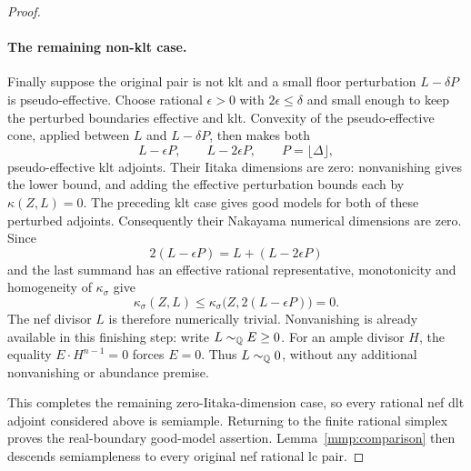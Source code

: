 \begin{proof}
\paragraph{The remaining non-klt case.}
Finally suppose the original pair is not klt and a small
floor perturbation $L-\delta P$ is pseudo-effective. Choose
rational $\epsilon>0$ with $2\epsilon\le\delta$ and small
enough to keep the perturbed boundaries effective and klt.
Convexity of the pseudo-effective cone, applied between
$L$ and $L-\delta P$, then makes both
\[
 L-\epsilon P,\qquad L-2\epsilon P,
 \qquad P=\lfloor\Delta\rfloor,
\]
pseudo-effective klt adjoints.
Their Iitaka dimensions are zero: nonvanishing gives the lower
bound, and adding the effective perturbation bounds each by
\(\kappa(Z,L)=0\).
The preceding klt case gives good models for both of these
perturbed adjoints.
Consequently their Nakayama numerical dimensions are zero.
Since
\[
 2(L-\epsilon P)
   =L+(L-2\epsilon P)
\]
and the last summand has an effective rational representative,
monotonicity and homogeneity of \(\kappa_\sigma\) give
\[
 \kappa_\sigma(Z,L)
 \leq\kappa_\sigma\bigl(Z,2(L-\epsilon P)\bigr)=0.
\]
The nef divisor \(L\) is therefore numerically trivial.
Nonvanishing is already available in this finishing step:
write \(L\sim_{\mathbb{Q}}E\geq 0\).
For an ample divisor \(H\), the equality
\(E\cdot H^{n-1}=0\) forces \(E=0\).
Thus \(L\sim_{\mathbb{Q}}0\), without any additional nonvanishing or
abundance premise.

This completes the remaining zero-Iitaka-dimension case, so every
rational nef dlt adjoint considered above is semiample. Returning
to the finite rational simplex proves the real-boundary good-model
assertion. Lemma~\ref{mmp:comparison} then descends semiampleness
to every original nef rational lc pair.
\end{proof}
